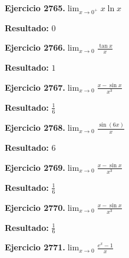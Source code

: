 \documentclass[10pt,a4paper]{article}
\begin{document}
\begin{ejbox}
\textbf{Ejercicio 2765.}\quad $\lim_{x\to 0^+} x\ln x$
\end{ejbox}

\begin{solbox}
\textbf{Resultado:} \(\displaystyle 0\)
\end{solbox}

\newpage
\begin{ejbox}
\textbf{Ejercicio 2766.}\quad $\lim_{x\to 0} \frac{\tan x}{x}$
\end{ejbox}

\begin{solbox}
\textbf{Resultado:} \(\displaystyle 1\)
\end{solbox}

\begin{ejbox}
\textbf{Ejercicio 2767.}\quad $\lim_{x\to 0} \frac{x-\sin x}{x^3}$
\end{ejbox}

\begin{solbox}
\textbf{Resultado:} \(\displaystyle \frac{1}{6}\)
\end{solbox}

\begin{ejbox}
\textbf{Ejercicio 2768.}\quad $\lim_{x\to 0} \frac{\sin(6x)}{x}$
\end{ejbox}

\begin{solbox}
\textbf{Resultado:} \(\displaystyle 6\)
\end{solbox}

\newpage
\begin{ejbox}
\textbf{Ejercicio 2769.}\quad $\lim_{x\to 0} \frac{x-\sin x}{x^3}$
\end{ejbox}

\begin{solbox}
\textbf{Resultado:} \(\displaystyle \frac{1}{6}\)
\end{solbox}

\begin{ejbox}
\textbf{Ejercicio 2770.}\quad $\lim_{x\to 0} \frac{x-\sin x}{x^3}$
\end{ejbox}

\begin{solbox}
\textbf{Resultado:} \(\displaystyle \frac{1}{6}\)
\end{solbox}

\begin{ejbox}
\textbf{Ejercicio 2771.}\quad $\lim_{x\to 0} \frac{e^x-1}{x}$
\end{ejbox}
\end{document}
